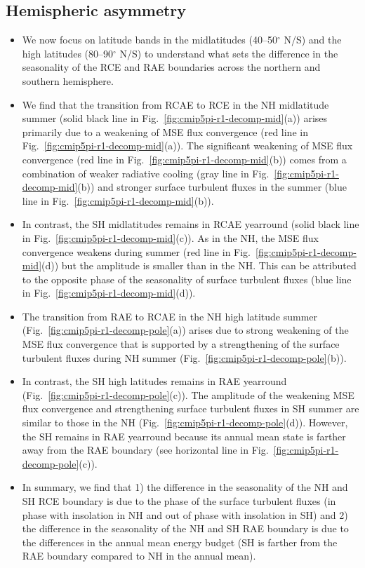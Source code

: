 \documentclass{ametsocV5}
\begin{document}
\subsection{Hemispheric asymmetry} \label{subsec:asym}
\begin{itemize}
  \item We now focus on latitude bands in the midlatitudes (40--50$^{\circ}$ N/S) and the high latitudes (80--90$^{\circ}$ N/S) to understand what sets the difference in the seasonality of the RCE and RAE boundaries across the northern and southern hemisphere.
  \item We find that the transition from RCAE to RCE in the NH midlatitude summer (solid black line in Fig.~\ref{fig:cmip5pi-r1-decomp-mid}(a)) arises primarily due to a weakening of MSE flux convergence (red line in Fig.~\ref{fig:cmip5pi-r1-decomp-mid}(a)). The significant weakening of MSE flux convergence (red line in Fig.~\ref{fig:cmip5pi-r1-decomp-mid}(b)) comes from a combination of weaker radiative cooling (gray line in Fig.~\ref{fig:cmip5pi-r1-decomp-mid}(b)) and stronger surface turbulent fluxes in the summer (blue line in Fig.~\ref{fig:cmip5pi-r1-decomp-mid}(b)).
  \item In contrast, the SH midlatitudes remains in RCAE yearround (solid black line in Fig.~\ref{fig:cmip5pi-r1-decomp-mid}(c)). As in the NH, the MSE flux convergence weakens during summer (red line in Fig.~\ref{fig:cmip5pi-r1-decomp-mid}(d)) but the amplitude is smaller than in the NH. This can be attributed to the opposite phase of the seasonality of surface turbulent fluxes (blue line in Fig.~\ref{fig:cmip5pi-r1-decomp-mid}(d)).
  \item The transition from RAE to RCAE in the NH high latitude summer (Fig.~\ref{fig:cmip5pi-r1-decomp-pole}(a)) arises due to strong weakening of the MSE flux convergence that is supported by a strengthening of the surface turbulent fluxes during NH summer (Fig.~\ref{fig:cmip5pi-r1-decomp-pole}(b)).
  \item In contrast, the SH high latitudes remains in RAE yearround (Fig.~\ref{fig:cmip5pi-r1-decomp-pole}(c)). The amplitude of the weakening MSE flux convergence and strengthening surface turbulent fluxes in SH summer are similar to those in the NH (Fig.~\ref{fig:cmip5pi-r1-decomp-pole}(d)). However, the SH remains in RAE yearround because its annual mean state is farther away from the RAE boundary (see horizontal line in Fig.~\ref{fig:cmip5pi-r1-decomp-pole}(c)).
  \item In summary, we find that 1) the difference in the seasonality of the NH and SH RCE boundary is due to the phase of the surface turbulent fluxes (in phase with insolation in NH and out of phase with insolation in SH) and 2) the difference in the seasonality of the NH and SH RAE boundary is due to the differences in the annual mean energy budget (SH is farther from the RAE boundary compared to NH in the annual mean).
\end{itemize}
\end{document}
